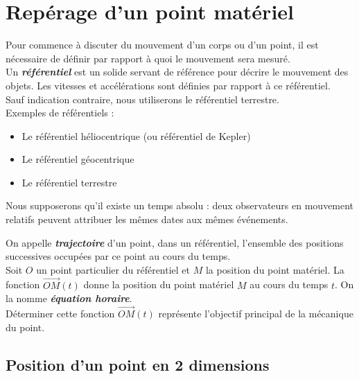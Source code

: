 \documentclass[10.5pt,a4paper]{book}
\begin{document}
\section{Repérage d'un point matériel}

\begin{boite}[Référentiel]
Pour commence à discuter du mouvement d'un corps ou d'un point, il est nécessaire de définir par rapport à quoi le mouvement sera mesuré.\\

Un \emph{\textbf{référentiel}} est un solide servant de référence pour décrire le mouvement des objets. Les vitesses et accélérations sont définies par rapport à ce référentiel.\\

Sauf indication contraire, nous utiliserons le référentiel terrestre.\\

Exemples de référentiels :
\begin{itemize}
    \item Le référentiel héliocentrique (ou référentiel de Kepler)
    \item Le référentiel géocentrique
    \item Le référentiel terrestre
\end{itemize}
Nous supposerons qu’il existe un temps absolu : deux observateurs en mouvement relatifs peuvent attribuer les mêmes dates aux mêmes événements.
\end{boite}

\begin{boite}
On appelle \emph{\textbf{trajectoire}} d'un point, dans un référentiel, l'ensemble des positions successives occupées par ce point au cours du temps.\\

Soit $O$ un point particulier du référentiel et $M$ la position du point matériel. La fonction $\overrightarrow{OM}(t)$ donne la position du point matériel $M$ au cours du temps $t$. On la nomme \emph{\textbf{équation horaire}}.\\

Déterminer cette fonction $\overrightarrow{OM}(t)$ représente l'objectif principal de la mécanique du point.
\end{boite}

\newpage
\subsection{Position d'un point en 2 dimensions}
\end{document}

